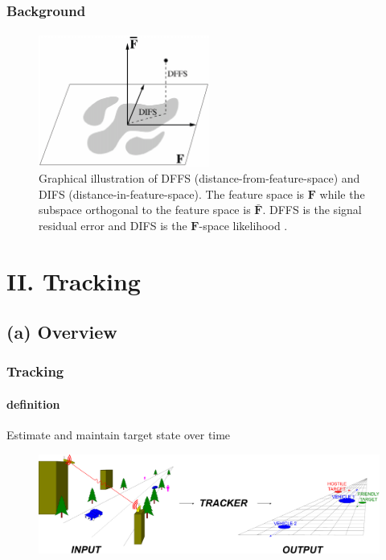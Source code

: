 \begin{frame}
\frametitle{Background}
\framesubtitle{}
\logoCSIPCPL\mypagenum
\begin{figure}[t]
\centering
\includegraphics[width=0.5\textwidth]{thesis/1998_JNL_ProbVisLearning_Moghaddam_fig3.png}
\caption{Graphical illustration of DFFS (distance-from-feature-space) and DIFS (distance-in-feature-space).  The feature space is $\mathbf{F}$ while the subspace orthogonal to the feature space is $\bar{\mathbf{F}}$.  DFFS is the signal residual error and DIFS is the $\mathbf{F}$-space likelihood \cite{1997_JNL_EigenTRK_Moghaddam}.}
\label{fig:1997_JNL_DIFSDFFS_Moghaddam}
\end{figure}
\end{frame}

\section{II. Tracking}
\subsection{(a) Overview}
\begin{frame}
\frametitle{Tracking}
\framesubtitle{definition}
\logoCSIPCPL\mypagenum
	Estimate and maintain {\color{red}target state} over {\color{red}time}
	\begin{figure}
		\includegraphics[width=1.0\textwidth]{thesis/TRK_overviewDiagram.pdf}
	\end{figure}
\end{frame}


